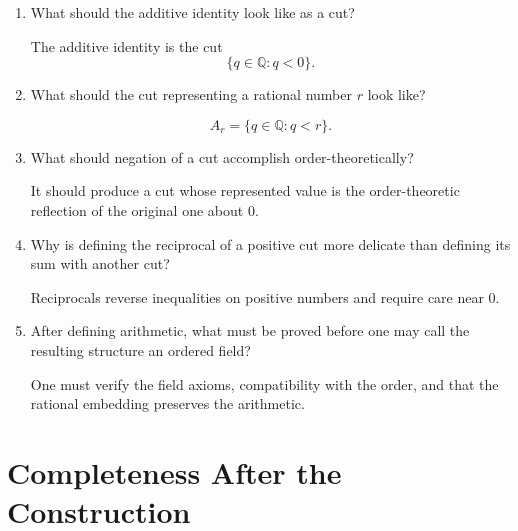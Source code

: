 \documentclass{self-check}
\begin{document}
\begin{enumerate}[label=\arabic*., itemsep=10pt]
\item What should the additive identity look like as a cut?

\begin{answer}
The additive identity is the cut
\[
\{q\in\mathbb{Q}:q<0\}.
\]
\end{answer}

\item What should the cut representing a rational number $r$ look like?

\begin{answer}
\[
A_r=\{q\in\mathbb{Q}:q<r\}.
\]
\end{answer}

\item What should negation of a cut accomplish order-theoretically?

\begin{answer}
It should produce a cut whose represented value is the order-theoretic reflection of the original one about $0$.
\end{answer}

\item Why is defining the reciprocal of a positive cut more delicate than defining its sum with another cut?

\begin{answer}
Reciprocals reverse inequalities on positive numbers and require care near $0$.
\end{answer}

\item After defining arithmetic, what must be proved before one may call the resulting structure an ordered field?

\begin{answer}
One must verify the field axioms, compatibility with the order, and that the rational embedding preserves the arithmetic.
\end{answer}

\end{enumerate}

\section{Completeness After the Construction}
\end{document}
